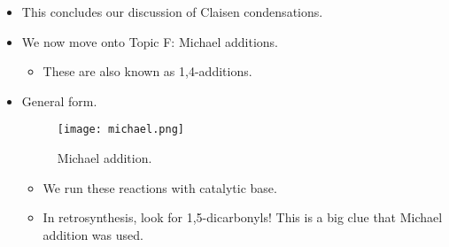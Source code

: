 \documentclass[../notes.tex]{subfiles}
\begin{document}
\begin{itemize}
\begin{figure}[h!]
    \end{figure}
    \begin{itemize}
        \item Here, we take advantage of the difference in $\pKa$'s.
        \begin{itemize}
            \item Essentially, we will form \num{e6} times more ketone enolate than ester enolate because $\pKa\approx 19$ at the $\alpha$-position of a ketone, and $\pKa\approx 25$ at the $\alpha$-position of an ester.
        \end{itemize}
        \item Takeaway: $\Delta\pKa$'s control the selectivity.
        \item However, there is one complication.
        \begin{itemize}
            \item Because ketones are more electrophilic than esters, the (non-dehydrogenated) aldol will form in solution more readily than the Claisen condensation product.
            \item However, the aldol product forms reversibly, and the Claisen one does not!
            \item Thus, the quick reversible equilibrium to the aldol product gives way to a slow, steady, and irreversible conversion to the Claisen condensation product, forming it exclusively in the end.
        \end{itemize}
    \end{itemize}
    \item This concludes our discussion of Claisen condensations.
    \item We now move onto Topic F: Michael additions.
    \begin{itemize}
        \item These are also known as 1,4-additions.
    \end{itemize}
    \item General form.
    \begin{figure}[h!]
        \centering
        \texttt{[image: michael.png]}
        \caption{Michael addition.}
        \label{fig:michael}
    \end{figure}
    \begin{itemize}
        \item We run these reactions with catalytic base.
        \item In retrosynthesis, look for 1,5-dicarbonyls! This is a big clue that Michael addition was used.

\end{itemize}
\end{itemize}
\end{document}
